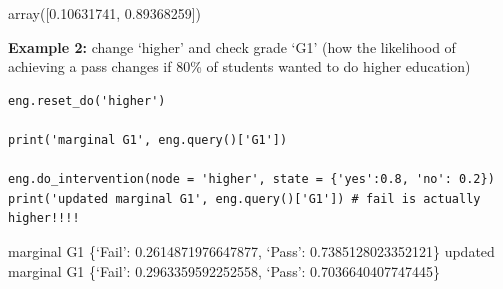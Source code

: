 \documentclass[
]{article}
\begin{document}
array({[}0.10631741, 0.89368259{]})

\textbf{Example 2:} change `higher' and check grade `G1' (how the
likelihood of achieving a pass changes if 80\% of students wanted to do
higher education)

\begin{verbatim}
eng.reset_do('higher')

print('marginal G1', eng.query()['G1'])

eng.do_intervention(node = 'higher', state = {'yes':0.8, 'no': 0.2})
print('updated marginal G1', eng.query()['G1']) # fail is actually higher!!!!
\end{verbatim}

marginal G1 \{`Fail': 0.2614871976647877, `Pass': 0.7385128023352121\}
updated marginal G1 \{`Fail': 0.2963359592252558, `Pass':
0.7036640407747445\}
\end{document}
